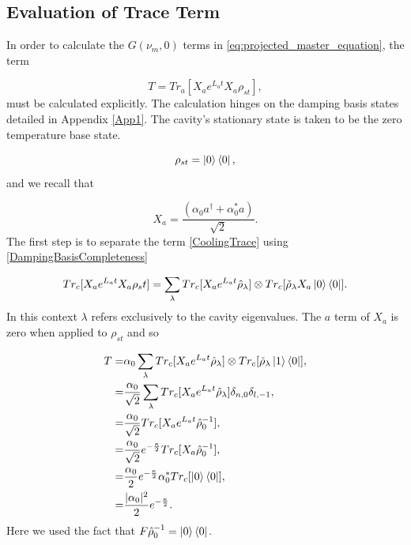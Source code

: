 \documentclass[reprint, amsmath,amssymb, aps,pra]{revtex4-1}
\begin{document}
\subsection{Evaluation of Trace Term}\label{TraceAppendix}

In order to calculate the $G(\nu_m,0)$ terms in \eqref{eq:projected_master_equation}, the term

\begin{equation}\label{CoolingTrace}
T=Tr_a[X_ae^{L_at}X_a\rho_{st}],
\end{equation} must be calculated explicitly. The calculation hinges on the damping basis states detailed in Appendix \ref{App1}. The cavity's stationary state is taken to be the zero temperature base state.

\begin{equation}
\rho_{st} = \Ket{0}\Bra{0},
\end{equation} and we recall that

\begin{equation}
X_a = \frac{(\alpha_0a^{\dagger}+\alpha_0^*a)}{\sqrt{2}}.
\end{equation} The first step is to separate the term \eqref{CoolingTrace} using \eqref{DampingBasisCompleteness}

\begin{equation}
Tr_c[X_ae^{L_at}X_a\rho_st] = \sum_\lambda Tr_c[X_ae^{L_at}\hat{\rho}_\lambda] \otimes Tr_c[\check{\rho}_\lambda X_a\Ket{0}\Bra{0}].
\end{equation} In this context $\lambda$ refers exclusively to the cavity eigenvalues. The $a$ term of $X_a$ is zero when applied to $\rho_{st}$ and so 

\begin{align}
T=& \alpha_0\sum_\lambda Tr_c[X_ae^{L_at}\hat{\rho}_\lambda] \otimes Tr_c[\check{\rho}_\lambda\Ket{1}\Bra{0}],\\
=&\frac{\alpha_0}{\sqrt{2}}\sum_\lambda Tr_c[X_ae^{L_at}\hat{\rho}_\lambda] \delta_{n,0}\delta_{l,-1},\\
=&\frac{\alpha_0}{\sqrt{2}} Tr_c[X_ae^{L_at}\hat{\rho}_0^{-1}],\\
=&\frac{\alpha_0}{\sqrt{2}}e^{-\frac{\kappa}{2}} Tr_c[X_a\hat{\rho}_0^{-1}],\\
=&\frac{\alpha_0}{2}e^{-\frac{\kappa}{2}}\alpha_0^*Tr_c[\Ket{0}\Bra{0}],\\
=&\frac{|\alpha_0|^2}{2}e^{-\frac{\kappa}{2}}.
\end{align} Here we used the fact that $F\hat{\rho}_0^{-1}=\Ket{0}\Bra{0}$. 









\end{document}
